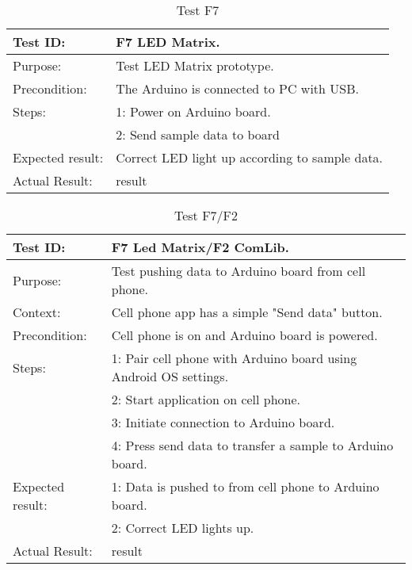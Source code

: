 \begin{table}[h!]
\begin{tabular}{|l|p{10cm}|}
\hline Test ID: & F7 LED Matrix. \\ 
\hline Purpose: & Test LED Matrix prototype. \\ 
\hline Precondition: & The Arduino is connected to PC with USB. \\ 
\hline
Steps: & 1: Power on Arduino board.\\ 
  & 2: Send sample data to board \\ 
  \hline
  Expected result: & Correct LED light up according to sample data.\\ 
  \hline
Actual Result: & result \\
  \hline
\end{tabular}
\caption{Test F7}
\label{tbl:f7test}
\end{table}

\begin{table}[h!]
\begin{tabular}{|l|p{10cm}|}
\hline Test ID: & F7 Led Matrix/F2 ComLib. \\ 
\hline Purpose: & Test pushing data to Arduino board from cell phone. \\ 
\hline Context: & Cell phone app has a simple "Send data" button. \\ 
\hline Precondition: & Cell phone is on and Arduino board is powered. \\ 
\hline
Steps: & 1: Pair cell phone with Arduino board using Android OS settings.\\ 
  & 2: Start application on cell phone. \\ 
  & 3: Initiate connection to Arduino board. \\ 
  & 4: Press send data to transfer a sample to Arduino board.\\
  \hline
  Expected result: & 1: Data is pushed to from cell phone to Arduino board.\\ 
    & 2: Correct LED lights up. \\ 
  \hline
Actual Result: &  result \\
  \hline
\end{tabular}
\caption{Test F7/F2}
\label{tbl:f7f2test}
\end{table}

